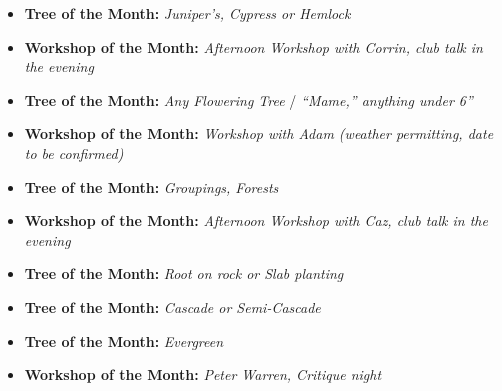 \label{2025-03-calendar}

\medskip
{}
\begin{itemize}
    \item \textbf{Tree of the Month:} \textit{Juniper's, Cypress or Hemlock}
    \item \textbf{Workshop of the Month:} \textit{Afternoon Workshop with \textit{Corrin}, club talk in the evening}
\end{itemize}

\medskip
{}
\begin{itemize}
    \item \textbf{Tree of the Month:} \textit{Any Flowering Tree} / \textit{``Mame,'' anything under 6''}
    \item \textbf{Workshop of the Month:} \textit{Workshop with Adam (weather permitting, date to be confirmed)}
\end{itemize}

\medskip
{}
\begin{itemize}
    \item \textbf{Tree of the Month:} \textit{Groupings, Forests}
    \item \textbf{Workshop of the Month:} \textit{Afternoon Workshop with \textit{Caz}, club talk in the evening}
\end{itemize}

\medskip
{}
\begin{itemize}
    \item \textbf{Tree of the Month:} \textit{Root on rock or Slab planting}
\end{itemize}

\medskip
{}
\begin{itemize}
    \item \textbf{Tree of the Month:} \textit{Cascade or Semi-Cascade}
\end{itemize}

\medskip
{}
\begin{itemize}
    \item \textbf{Tree of the Month:} \textit{Evergreen}
    \item \textbf{Workshop of the Month:} \textit{\textit{Peter Warren,} Critique night}
\end{itemize}

